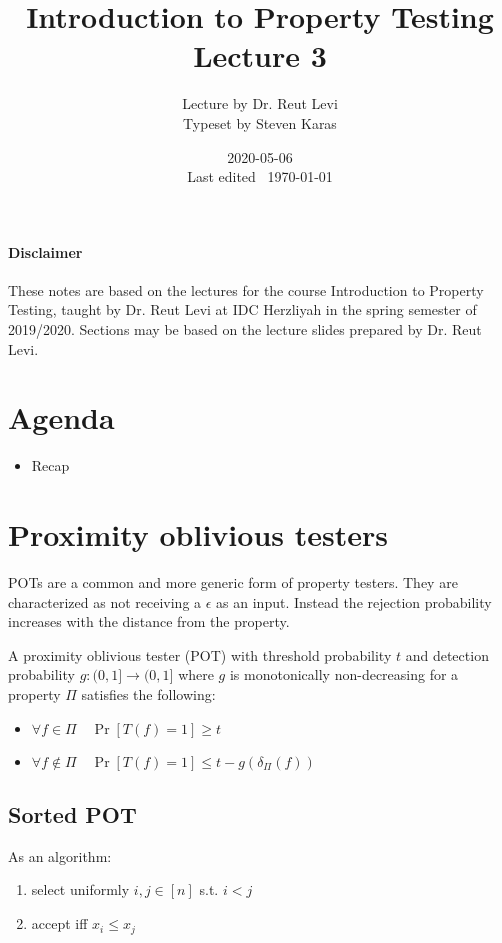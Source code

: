 \documentclass{idc_msc}
\title{Introduction to Property Testing \\\large Lecture 3}
\date{2020-05-06 \\ Last edited \currenttime\ \today}
\author{Lecture by Dr. Reut Levi\\Typeset by Steven Karas}
\begin{document}
\nocite{goldreich2017introduction}

\paragraph{Disclaimer}

These notes are based on the lectures for the course Introduction to Property Testing, taught by Dr. Reut Levi at IDC Herzliyah in the spring semester of 2019/2020.
Sections may be based on the lecture slides prepared by Dr. Reut Levi.

\section{Agenda}

  \begin{itemize}
    \item Recap
  \end{itemize}


\section{Proximity oblivious testers}

POTs are a common and more generic form of property testers.
They are characterized as not receiving a \(\epsilon\) as an input.
Instead the rejection probability increases with the distance from the property.

A proximity oblivious tester (POT) with threshold probability \(t\) and detection probability \(g: (0, 1] \to (0, 1]\) where \(g\) is monotonically non-decreasing for a property \(\Pi\) satisfies the following:

\begin{itemize}
  \item \(\forall f \in \Pi \quad \Pr[T(f) = 1] \ge t\)
  \item \(\forall f \notin \Pi \quad \Pr[T(f) = 1] \le t - g(\delta_\Pi(f))\)
\end{itemize}

\subsection{Sorted POT}

As an algorithm:

\begin{enumerate}
  \item select uniformly \(i, j \in [n]\) s.t. \(i < j\)
  \item accept iff \(x_i \le x_j\)
\end{enumerate}
\end{document}
